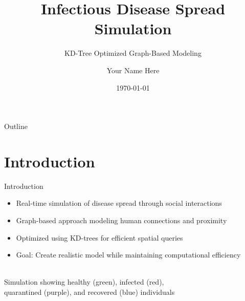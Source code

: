 \documentclass{beamer}
\title{Infectious Disease Spread Simulation}
\subtitle{KD-Tree Optimized Graph-Based Modeling}
\author{Your Name Here}
\institute{Design and Analysis of Algorithms}
\date{\today}
\begin{document}
\begin{frame}
\titlepage
\end{frame}

\begin{frame}{Outline}
\tableofcontents
\end{frame}

\section{Introduction}
\begin{frame}{Introduction}
\begin{itemize}
    \item Real-time simulation of disease spread through social interactions
    \item Graph-based approach modeling human connections and proximity
    \item Optimized using KD-trees for efficient spatial queries
    \item Goal: Create realistic model while maintaining computational efficiency
\end{itemize}

\vspace{0.5cm}
\begin{center}
    \\
    \small{Simulation showing healthy (green), infected (red),\\ quarantined (purple), and recovered (blue) individuals}
\end{center}
\end{frame}
\end{document}
